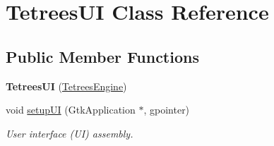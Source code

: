 \hypertarget{classTetreesUI}{}\section{Tetrees\+UI Class Reference}
\label{classTetreesUI}
\subsection*{Public Member Functions}
\begin{DoxyCompactItemize}
\item 
\mbox{\label{classTetreesUI_ad6a5b91b1574c25c2bcd48601142013c}} 
{\bfseries Tetrees\+UI} (\hyperlink{classTetreesEngine}{Tetrees\+Engine})
\item 
void \hyperlink{classTetreesUI_a492d68860089cfbe52c5756b2c3cd2ae}{setup\+UI} (Gtk\+Application $\ast$, gpointer)
\begin{DoxyCompactList}\small\item\em User interface (UI) assembly. \end{DoxyCompactList}\end{DoxyCompactItemize}
